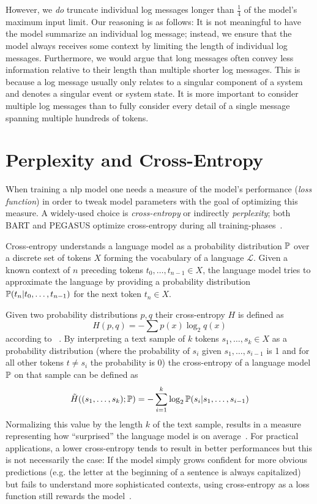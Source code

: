 However, we \emph{do} truncate individual log messages longer than \(\frac{1}{4}\) of the model's maximum input limit.
Our reasoning is as follows:
It is not meaningful to have the model summarize an individual log message;
instead, we ensure that the model always receives some context
by limiting the length of individual log messages.
Furthermore, we would argue that
long messages often convey less information relative to their length than multiple shorter log messages.
This is because a log message usually only relates to a singular component of a system and denotes a singular event or system state.
It is more important to consider multiple log messages than to fully consider every detail of a single message spanning multiple hundreds of tokens.

\section{Perplexity and Cross-Entropy}\label{sec:perplexity}

When training a \ac{nlp} model one needs a measure of the model's performance (\emph{loss function})
in order to tweak model parameters with the goal of optimizing this measure.
A widely-used choice is \emph{cross-entropy} or indirectly \emph{perplexity};
both BART and PEGASUS optimize cross-entropy during all training-phases~\parencites[7872]{bart}[11336]{pegasus}.

Cross-entropy understands a language model as a probability distribution \(\mathbb{P}\) over a
discrete set of tokens \(X\) forming the vocabulary of a language \(\mathcal{L}\).
Given a known context of \(n\) preceding tokens \(t_0, \ldots, t_{n-1} \in X\),
the language model tries to approximate the language by
providing a probability distribution \(\mathbb{P}(t_n | t_0, \ldots, t_{n-1})\) for the next token \(t_n \in X\).

Given two probability distributions \(p, q\) their cross-entropy \(H\) is defined as
\begin{equation}
H(p, q) = - \sum p(x) \log_2 q(x)
\end{equation}
according to \citeauthor*{statistical_nlp}~\parencite[74]{statistical_nlp}.
By interpreting a text sample of \(k\) tokens \(s_1, \ldots, s_k \in X\)
as a probability distribution
(where the probability of \(s_i\) given \(s_1, \ldots, s_{i-1}\) is 1 and for all other tokens \(t \neq s_i\) the probability is 0)
the cross-entropy of a language model \(\mathbb{P}\) on that sample can be defined as
\begin{equation}
\tilde{H}((s_1, \ldots, s_k); \mathbb{P}) = - \sum_{i=1}^k \log_2 \mathbb{P}(s_i | s_1, \ldots, s_{i-1})
\end{equation}
Normalizing this value by the length \(k\) of the text sample,
results in a measure representing how \enquote{surprised} the language model is on average~\parencite[74]{statistical_nlp}.
For practical applications, a lower cross-entropy tends to result in better performances but this is not necessarily the case:
If the model simply grows confident for more obvious predictions (e.g. the letter at the beginning of a sentence is always capitalized)
but fails to understand more sophisticated contexts,
using cross-entropy as a loss function still rewards the model~\parencite[75]{statistical_nlp}.

